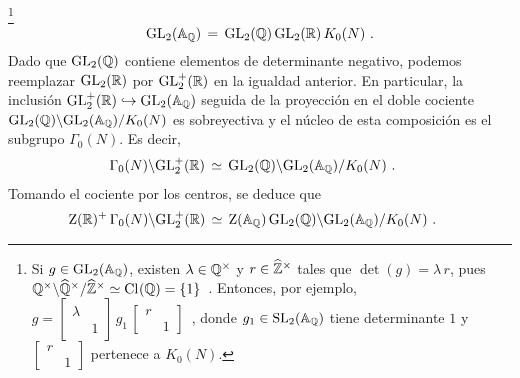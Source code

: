 \footnote{
	Si $g\in\mathrm{GL}_{2}(\mathbb{A}_{\mathbb{Q}})$, existen $\lambda\in\mathbb{Q}^{\times}$
	y $r\in\widehat{\mathbb{Z}}^{\times}$ tales que $\det(g)=\lambda\,r$, pues
	\begin{math}
		\mathbb{Q}^{\times}\backslash\widehat{\mathbb{Q}}^{\times}/\widehat{\mathbb{Z}}^{\times}\simeq
			\mathrm{Cl}^{}(\mathbb{Q})=\{1\}
	\end{math}~. Entonces, por ejemplo,
	\begin{math}
		g=\left[\begin{smallmatrix} \lambda & \\
			& 1 \end{smallmatrix}\right]\,g_1\,
			\left[\begin{smallmatrix} r & \\
			& 1 \end{smallmatrix}\right]
	\end{math}~, donde $g_1\in\mathrm{SL}_{2}(\mathbb{A}_{\mathbb{Q}})$ tiene determinante
	$1$ y
	\begin{math}
		\left[\begin{smallmatrix} r & \\ & 1 \end{smallmatrix}\right]
	\end{math} pertenece a $K_{0}(N)$.
}
\begin{equation}
	\label{eq:aproximacionfuerteintro}
	\mathrm{GL}_{2}(\mathbb{A}_{\mathbb{Q}}) \,=\,
		\mathrm{GL}_{2}(\mathbb{Q})\,\mathrm{GL}_{2}(\mathbb{R})\,K_{0}(N)
	\text{ .}
\end{equation}
%
Dado que $\mathrm{GL}_{2}(\mathbb{Q})$ contiene elementos de determinante negativo, podemos
reemplazar $\mathrm{GL}_{2}(\mathbb{R})$ por $\mathrm{GL}^{+}_{2}(\mathbb{R})$ en la igualdad anterior.
En particular, la inclusi\'{o}n
\begin{math}
	\mathrm{GL}^{+}_{2}(\mathbb{R})\hookrightarrow\mathrm{GL}_{2}(\mathbb{A}_{\mathbb{Q}})
\end{math}
seguida de la proyecci\'{o}n en el doble cociente
\begin{math}
	\mathrm{GL}_{2}(\mathbb{Q})\backslash\mathrm{GL}_{2}(\mathbb{A}_{\mathbb{Q}})/K_{0}(N)
\end{math}
es sobreyectiva y el n\'{u}cleo de esta composici\'{o}n es el subgrupo
$\Gamma_{0}(N)$.
Es decir,
\begin{align*}
	\Gamma_{0}(N)\backslash\mathrm{GL}^{+}_{2}(\mathbb{R}) & \,\simeq\,
		\mathrm{GL}_{2}(\mathbb{Q})\backslash\mathrm{GL}_{2}(\mathbb{A}_{\mathbb{Q}})/K_{0}(N)
	\text{ .}
\end{align*}
%
Tomando el cociente por los centros, se deduce que
\begin{align*}
	\mathrm{Z}(\mathbb{R})^{+}\,\Gamma_{0}(N)\backslash\mathrm{GL}^{+}_{2}(\mathbb{R})
		& \,\simeq\, \mathrm{Z}(\mathbb{A}_{\mathbb{Q}})\,\mathrm{GL}_{2}(\mathbb{Q})
		\backslash\mathrm{GL}_{2}(\mathbb{A}_{\mathbb{Q}})/K_{0}(N)
	\text{ .}
\end{align*}
